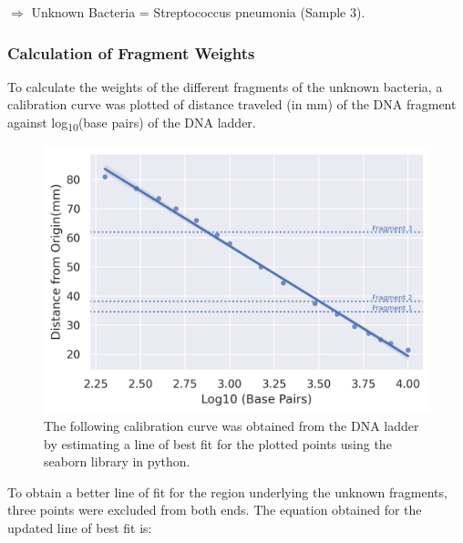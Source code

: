 \documentclass[pdflatex,sn-mathphys]{sn-jnl}%
\theoremstyle{thmstyleone}%
\theoremstyle{thmstyletwo}%
\theoremstyle{thmstylethree}%
\begin{document}
$\Rightarrow$ Unknown Bacteria = Streptococcus pneumonia (Sample 3).

\subsubsection*{Calculation of Fragment Weights}
To calculate the weights of the different fragments of the unknown bacteria, a calibration curve was plotted of distance traveled (in mm) of the DNA fragment against log\textsubscript{10}(base pairs) of the DNA ladder.

\begin{figure}[hp]
\centering
\includegraphics[width=1\textwidth]{photos/calibration curve.png}
\caption{The following calibration curve was obtained from the DNA ladder by estimating a line of best fit for the plotted points using the seaborn library in python.}\label{fig1}
\end{figure}
To obtain a better line of fit for the region underlying the unknown fragments, three points were excluded from both ends. The equation obtained for the updated line of best fit is:
\end{document}
